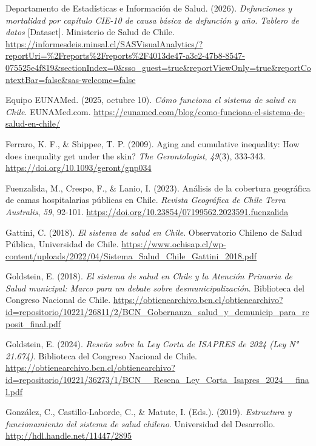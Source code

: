 \documentclass[
  spanish,
  a4paper,
  oneside]{scrbook}
\newlength{\cslhangindent}
\newenvironment{CSLReferences}[2] %
 {\begin{list}{}{%
  \setlength{\itemindent}{0pt}
  \setlength{\leftmargin}{0pt}
  \setlength{\parsep}{0pt}
  \ifodd #1
   \setlength{\leftmargin}{\cslhangindent}
   \setlength{\itemindent}{-1\cslhangindent}
  \fi
  \setlength{\itemsep}{#2\baselineskip}}}
 {\end{list}}
\begin{document}
\begin{CSLReferences}{1}{0}
Departamento de Estadísticas e Información de Salud. (2026).
\emph{Defunciones y mortalidad por capítulo {CIE-10} de causa básica de
defunción y año. Tablero de datos} {[}Dataset{]}. Ministerio de Salud de
Chile.
\url{https://informesdeis.minsal.cl/SASVisualAnalytics/?reportUri=\%2Freports\%2Freports\%2F4013de47-a3c2-47b8-8547-075525e4f819&sectionIndex=0&sso_guest=true&reportViewOnly=true&reportContextBar=false&sas-welcome=false}

Equipo EUNAMed. (2025, octubre 10). \emph{Cómo funciona el sistema de
salud en Chile}. EUNAMed.com.
\url{https://eunamed.com/blog/como-funciona-el-sistema-de-salud-en-chile/}

Ferraro, K. F., \& Shippee, T. P. (2009). Aging and cumulative
inequality: {How} does inequality get under the skin? \emph{The
Gerontologist}, \emph{49}(3), 333-343.
\url{https://doi.org/10.1093/geront/gnp034}

Fuenzalida, M., Crespo, F., \& Lanio, I. (2023). Análisis de la
cobertura geográfica de camas hospitalarias públicas en Chile.
\emph{Revista Geográfica de Chile Terra Australis}, \emph{59}, 92-101.
\url{https://doi.org/10.23854/07199562.2023591.fuenzalida}

Gattini, C. (2018). \emph{El sistema de salud en Chile}. Observatorio
Chileno de Salud Pública, Universidad de Chile.
\url{https://www.ochisap.cl/wp-content/uploads/2022/04/Sistema_Salud_Chile_Gattini_2018.pdf}

Goldstein, E. (2018). \emph{El sistema de salud en Chile y la Atención
Primaria de Salud municipal: Marco para un debate sobre
desmunicipalización}. Biblioteca del Congreso Nacional de Chile.
\url{https://obtienearchivo.bcn.cl/obtienearchivo?id=repositorio/10221/26811/2/BCN_Gobernanza_salud_y_demunicip_para_reposit_final.pdf}

Goldstein, E. (2024). \emph{Reseña sobre la Ley Corta de ISAPRES de 2024
(Ley N° 21.674)}. Biblioteca del Congreso Nacional de Chile.
\url{https://obtienearchivo.bcn.cl/obtienearchivo?id=repositorio/10221/36273/1/BCN__Resena_Ley_Corta_Isapres_2024__final.pdf}

González, C., Castillo-Laborde, C., \& Matute, I. (Eds.). (2019).
\emph{Estructura y funcionamiento del sistema de salud chileno}.
Universidad del Desarrollo. \url{http://hdl.handle.net/11447/2895}


\end{CSLReferences}
\end{document}
